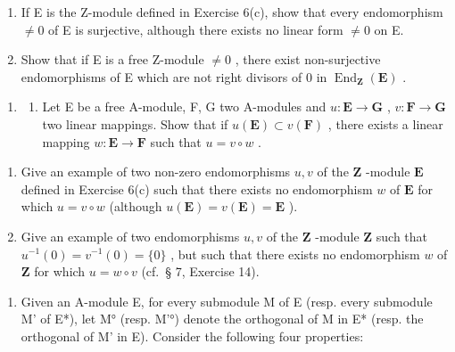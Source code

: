 \begin{enumerate}
\def\labelenumi{(\alph{enumi})}
\setcounter{enumi}{1}
\item
  If E is the Z-module defined in Exercise 6(c), show that every endomorphism \(\neq 0\) of E is surjective, although there exists no linear form \(\neq 0\) on E.
\item
  Show that if E is a free Z-module \(\neq0\) , there exist non-surjective endomorphisms of E which are not right divisors of 0 in \(\operatorname{End}_{\mathbf{Z}}(\mathbf{E})\) .
\end{enumerate}

\begin{enumerate}
\def\labelenumi{\arabic{enumi}.}
\setcounter{enumi}{7}
\tightlist
\item
  \begin{enumerate}
  \def\labelenumii{(\alph{enumii})}
  \tightlist
  \item
    Let E be a free A-module, F, G two A-modules and \(u: \mathbf{E} \to \mathbf{G}\) , \(v: \mathbf{F} \to \mathbf{G}\) two linear mappings. Show that if \(u(\mathbf{E}) \subset v(\mathbf{F})\) , there exists a linear mapping \(w: \mathbf{E} \to \mathbf{F}\) such that \(u = v \circ w\) .
  \end{enumerate}
\end{enumerate}

\begin{enumerate}
\def\labelenumi{(\alph{enumi})}
\setcounter{enumi}{1}
\item
  Give an example of two non-zero endomorphisms \(u, v\) of the \(\mathbf{Z}\) -module \(\mathbf{E}\) defined in Exercise 6(c) such that there exists no endomorphism \(w\) of \(\mathbf{E}\) for which \(u = v \circ w\) (although \(u(\mathbf{E}) = v(\mathbf{E}) = \mathbf{E}\) ).
\item
  Give an example of two endomorphisms \(u, v\) of the \(\mathbf{Z}\) -module \(\mathbf{Z}\) such that \(u^{-1}(0) = v^{-1}(0) = \{0\}\) , but such that there exists no endomorphism \(w\) of \(\mathbf{Z}\) for which \(u = w \circ v\) (cf.~§ 7, Exercise 14).
\end{enumerate}

\begin{enumerate}
\def\labelenumi{\arabic{enumi}.}
\setcounter{enumi}{8}
\tightlist
\item
  Given an A-module E, for every submodule M of E (resp. every submodule M' of E*), let M° (resp. M'°) denote the orthogonal of M in E* (resp. the orthogonal of M' in E). Consider the following four properties:
\end{enumerate}

